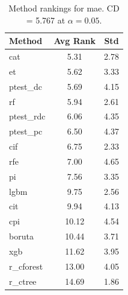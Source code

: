 \begin{table}[h]
\centering
\caption{Method rankings for mae. CD = 5.767 at $\alpha=0.05$.}
\label{tab:ranks_mae}
\begin{tabular}{lcc}
\toprule
Method & Avg Rank & Std \\
\midrule
cat & 5.31 & 2.78 \\
et & 5.62 & 3.33 \\
ptest_dc & 5.69 & 4.15 \\
rf & 5.94 & 2.61 \\
ptest_rdc & 6.06 & 4.35 \\
ptest_pc & 6.50 & 4.37 \\
cif & 6.75 & 2.33 \\
rfe & 7.00 & 4.65 \\
pi & 7.56 & 3.35 \\
lgbm & 9.75 & 2.56 \\
cit & 9.94 & 4.13 \\
cpi & 10.12 & 4.54 \\
boruta & 10.44 & 3.71 \\
xgb & 11.62 & 3.95 \\
r_cforest & 13.00 & 4.05 \\
r_ctree & 14.69 & 1.86 \\
\bottomrule
\end{tabular}
\end{table}